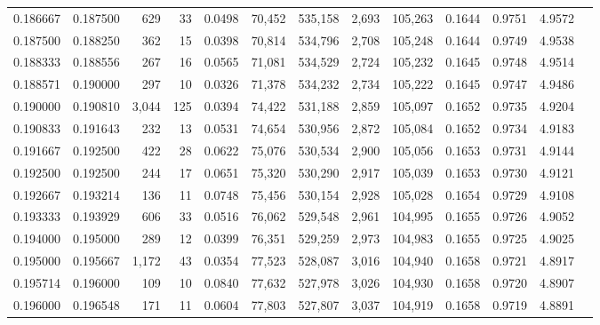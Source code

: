 \begin{tabular}{rrrrrrrrrrrrr}
0.186667 & 0.187500 &   629 &  33 &                                     0.0498 &  70,452 & 535,158 &   2,693 & 105,263 & 0.1644 & 0.9751 & 4.9572 \\
0.187500 & 0.188250 &   362 &  15 &                                     0.0398 &  70,814 & 534,796 &   2,708 & 105,248 & 0.1644 & 0.9749 & 4.9538 \\
0.188333 & 0.188556 &   267 &  16 &                                     0.0565 &  71,081 & 534,529 &   2,724 & 105,232 & 0.1645 & 0.9748 & 4.9514 \\
0.188571 & 0.190000 &   297 &  10 &                                     0.0326 &  71,378 & 534,232 &   2,734 & 105,222 & 0.1645 & 0.9747 & 4.9486 \\
0.190000 & 0.190810 & 3,044 & 125 &                                     0.0394 &  74,422 & 531,188 &   2,859 & 105,097 & 0.1652 & 0.9735 & 4.9204 \\
0.190833 & 0.191643 &   232 &  13 &                                     0.0531 &  74,654 & 530,956 &   2,872 & 105,084 & 0.1652 & 0.9734 & 4.9183 \\
0.191667 & 0.192500 &   422 &  28 &                                     0.0622 &  75,076 & 530,534 &   2,900 & 105,056 & 0.1653 & 0.9731 & 4.9144 \\
0.192500 & 0.192500 &   244 &  17 &                                     0.0651 &  75,320 & 530,290 &   2,917 & 105,039 & 0.1653 & 0.9730 & 4.9121 \\
0.192667 & 0.193214 &   136 &  11 &                                     0.0748 &  75,456 & 530,154 &   2,928 & 105,028 & 0.1654 & 0.9729 & 4.9108 \\
0.193333 & 0.193929 &   606 &  33 &                                     0.0516 &  76,062 & 529,548 &   2,961 & 104,995 & 0.1655 & 0.9726 & 4.9052 \\
0.194000 & 0.195000 &   289 &  12 &                                     0.0399 &  76,351 & 529,259 &   2,973 & 104,983 & 0.1655 & 0.9725 & 4.9025 \\
0.195000 & 0.195667 & 1,172 &  43 &                                     0.0354 &  77,523 & 528,087 &   3,016 & 104,940 & 0.1658 & 0.9721 & 4.8917 \\
0.195714 & 0.196000 &   109 &  10 &                                     0.0840 &  77,632 & 527,978 &   3,026 & 104,930 & 0.1658 & 0.9720 & 4.8907 \\
0.196000 & 0.196548 &   171 &  11 &                                     0.0604 &  77,803 & 527,807 &   3,037 & 104,919 & 0.1658 & 0.9719 & 4.8891 \\

\end{tabular}
